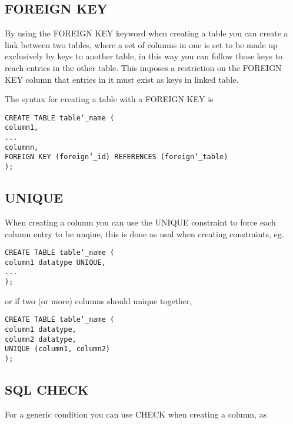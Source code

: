\documentclass[10pt, english]{article}
\begin{document}
\subsection{FOREIGN KEY}
By using the FOREIGN KEY keyword when creating a table you can create a link between two tables, where a set of columns in one is set to be made up exclusively by keys to another table,
in this way you can follow those keys to reach entries in the other table. This imposes a restriction on the FOREIGN KEY column that entries in it must exist as keys in linked
table. 

The syntax for creating a table with a FOREIGN KEY is

\texttt{CREATE TABLE table\char`_name (\\
\hspace*{10pt} column1, \\
\hspace*{10pt} ... \\
\hspace*{10pt} columnn, \\
\hspace*{10pt} FOREIGN KEY (foreign\char`_id) REFERENCES (foreign\char`_table)\\
);
}

\subsection{UNIQUE}
When creating a column you can use the UNIQUE constraint to force each column entry to be unqiue, this is done as usal when creating constraints,
eg. 

\texttt{CREATE TABLE table\char`_name (\\
\hspace*{10pt} column1 datatype UNIQUE, \\ 
\hspace*{10pt} ... \\
);
}

or if two (or more) columns should unique together,

\texttt{CREATE TABLE table\char`_name (\\
\hspace*{10pt} column1 datatype, \\
\hspace*{10pt} column2 datatype, \\
\hspace*{10pt} UNIQUE (column1, column2) \\
);
}

\subsection{SQL CHECK}
For a generic condition you can use CHECK when creating a column, as 
\end{document}

